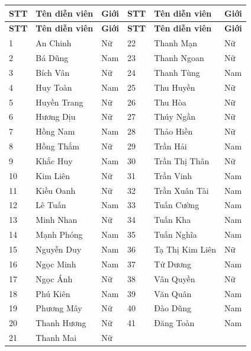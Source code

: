 \begin{longtable}{|p{0.7cm}|p{4.7cm}|p{1.3cm}|p{0.7cm}|p{4.7cm}|p{1.3cm}|}
  \hline
  \textbf{STT} & \textbf{Tên diễn viên} & \textbf{Giới} & \textbf{STT} & \textbf{Tên diễn viên} & \textbf{Giới} \\
  \hline
  \endfirsthead
  \hline
  \textbf{STT} & \textbf{Tên diễn viên} & \textbf{Giới} & \textbf{STT} & \textbf{Tên diễn viên} & \textbf{Giới} \\
  \hline
  \endhead
  \hline
  \endfoot

  1  & An Chinh        & Nữ  & 22 & Thanh Mạn       & Nữ  \\ \hline
  2  & Bá Dũng         & Nam & 23 & Thanh Ngoan     & Nữ  \\ \hline
  3  & Bích Vân        & Nữ  & 24 & Thanh Tùng      & Nam \\ \hline
  4  & Huy Toàn        & Nam & 25 & Thu Huyền       & Nữ  \\ \hline
  5  & Huyền Trang     & Nữ  & 26 & Thu Hòa         & Nữ  \\ \hline
  6  & Hương Dịu       & Nữ  & 27 & Thúy Ngần       & Nữ  \\ \hline
  7  & Hồng Nam        & Nam & 28 & Thảo Hiền       & Nữ  \\ \hline
  8  & Hồng Thắm       & Nữ  & 29 & Trần Hải        & Nam \\ \hline
  9  & Khắc Huy        & Nam & 30 & Trần Thị Thân   & Nữ  \\ \hline
  10 & Kim Liên        & Nữ  & 31 & Trần Vinh       & Nam \\ \hline
  11 & Kiều Oanh       & Nữ  & 32 & Trần Xuân Tài   & Nam \\ \hline
  12 & Lê Tuấn         & Nam & 33 & Tuấn Cường      & Nam \\ \hline
  13 & Minh Nhan       & Nữ  & 34 & Tuấn Kha        & Nam \\ \hline
  14 & Mạnh Phóng      & Nam & 35 & Tuấn Nghĩa      & Nam \\ \hline
  15 & Nguyễn Duy      & Nam & 36 & Tạ Thị Kim Liên & Nữ  \\ \hline
  16 & Ngọc Minh       & Nam & 37 & Tử Dương        & Nam \\ \hline
  17 & Ngọc Ánh        & Nữ  & 38 & Vân Quyền       & Nữ  \\ \hline
  18 & Phú Kiên        & Nam & 39 & Văn Quân        & Nam \\ \hline
  19 & Phương Mây      & Nữ  & 40 & Đào Dũng        & Nam \\ \hline
  20 & Thanh Hương     & Nữ  & 41 & Đăng Toàn       & Nam \\ \hline
  21 & Thanh Mai       & Nữ  &    &                 &     \\ \hline
\end{longtable}

